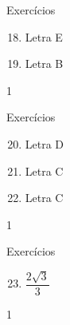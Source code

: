 \clearmargin
\begin{answer}{Exercícios}
{\exerciselist
  \begin{enumerate}\setcounter{enumi}{17}
  \item Letra E
  \item Letra B
  \end{enumerate}
}{1}
\end{answer}
\clearmargin
\begin{answer}{Exercícios}
{\exerciselist
  \begin{enumerate}\setcounter{enumi}{19}
  \item Letra D
  \item Letra C
  \item Letra C
  \end{enumerate}
}{1}
\end{answer}
\clearmargin
\begin{answer}{Exercícios}
{\exerciselist
  \begin{enumerate}\setcounter{enumi}{22}
  \item $\dfrac{2\sqrt{3}}{3}$
  \end{enumerate}
}{1}
\end{answer}

